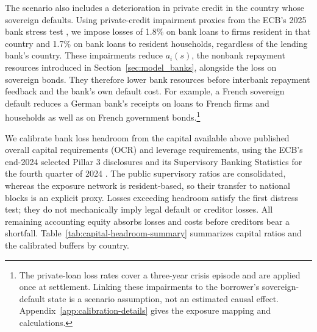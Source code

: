 The scenario also includes a deterioration in private credit in the country whose sovereign defaults. Using private-credit impairment proxies from the ECB's 2025 bank stress test \citep{ECBStress2025}, we impose losses of 1.8\% on bank loans to firms resident in that country and 1.7\% on bank loans to resident households, regardless of the lending bank's country. These impairments reduce $a_i(s)$, the nonbank repayment resources introduced in Section~\ref{sec:model_banks}, alongside the loss on sovereign bonds. They therefore lower bank resources before interbank repayment feedback and the bank's own default cost. For example, a French sovereign default reduces a German bank's receipts on loans to French firms and households as well as on French government bonds.\footnote{The private-loan loss rates cover a three-year crisis episode and are applied once at settlement. Linking these impairments to the borrower's sovereign-default state is a scenario assumption, not an estimated causal effect. Appendix~\ref{app:calibration-details} gives the exposure mapping and calculations.}

We calibrate bank loss headroom from the capital available above published overall capital requirements (OCR) and leverage requirements, using the ECB's end-2024 selected Pillar 3 disclosures and its Supervisory Banking Statistics for the fourth quarter of 2024 \citep{ECBPublicCapital}. The public supervisory ratios are consolidated, whereas the exposure network is resident-based, so their transfer to national blocks is an explicit proxy. Losses exceeding headroom satisfy the first distress test; they do not mechanically imply legal default or creditor losses. All remaining accounting equity absorbs losses and costs before creditors bear a shortfall. Table~\ref{tab:capital-headroom-summary} summarizes capital ratios and the calibrated buffers by country.

\begin{table}[htbp]
\centering
{}
\label{tab:capital-headroom-summary}
\small


\end{table}


